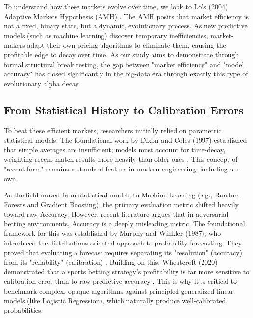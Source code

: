 \documentclass[pdflatex,sn-basic]{sn-jnl}
\begin{document}
To understand how these markets evolve over time, we look to Lo's (2004) Adaptive Markets Hypothesis (AMH) \cite{lo2004}. The AMH posits that market efficiency is not a fixed, binary state, but a dynamic, evolutionary process. As new predictive models (such as machine learning) discover temporary inefficiencies, market-makers adapt their own pricing algorithms to eliminate them, causing the profitable edge to decay over time. As our study aims to demonstrate through formal structural break testing, the gap between "market efficiency" and "model accuracy" has closed significantly in the big-data era through exactly this type of evolutionary alpha decay.

\subsection{From Statistical History to Calibration Errors}
To beat these efficient markets, researchers initially relied on parametric statistical models. The foundational work by Dixon and Coles (1997) established that simple averages are insufficient; models must account for time-decay, weighting recent match results more heavily than older ones \cite{dixon1997}. This concept of "recent form" remains a standard feature in modern engineering, including our own.

As the field moved from statistical models to Machine Learning (e.g., Random Forests and Gradient Boosting), the primary evaluation metric shifted heavily toward raw Accuracy. However, recent literature argues that in adversarial betting environments, Accuracy is a deeply misleading metric. The foundational framework for this was established by Murphy and Winkler (1987), who introduced the distributions-oriented approach to probability forecasting. They proved that evaluating a forecast requires separating its "resolution" (accuracy) from its "reliability" (calibration) \cite{murphy1987}. Building on this, Wheatcroft (2020) demonstrated that a sports betting strategy's profitability is far more sensitive to calibration error than to raw predictive accuracy \cite{wheatcroft2019}. This is why it is critical to benchmark complex, opaque algorithms against principled generalized linear models (like Logistic Regression), which naturally produce well-calibrated probabilities.
\end{document}
